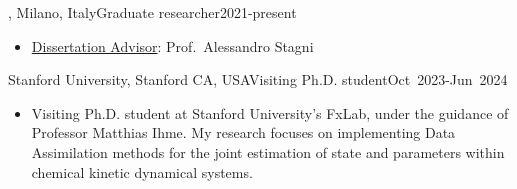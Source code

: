 \begin{position}{\polimi, Milano, Italy}{Graduate researcher}{2021-present}
   \begin{itemize}
      \item[ ] \ul{Dissertation Advisor}: Prof.\ Alessandro Stagni
   \end{itemize}
\end{position}

\begin{position}{Stanford University, Stanford CA, USA}{Visiting Ph.D. student}{Oct~2023-Jun~2024}
   \begin{itemize}
      \item[ ] Visiting Ph.D. student at Stanford University's FxLab, under the guidance of
         Professor Matthias Ihme. My research focuses on implementing Data Assimilation
         methods for the joint estimation of state and parameters within chemical kinetic
         dynamical systems.
   \end{itemize}
\end{position}
